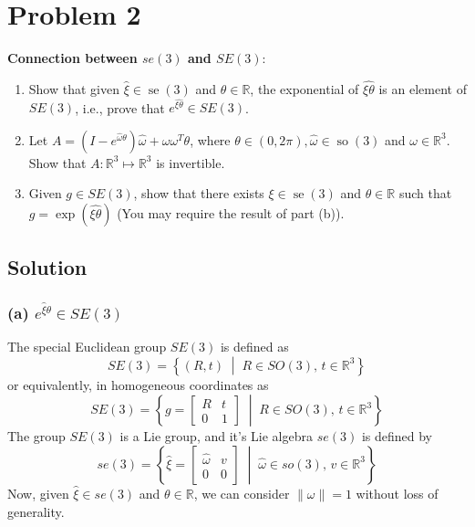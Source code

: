 \section*{Problem 2}
\setcounter{section}{2}
\setcounter{equation}{0}

\textbf{Connection between \( s e(3) \) and \( S E(3) \)}:
\begin{enumerate}[label= (\alph*)]
      \item Show that given \( \hat{\xi} \in \operatorname{se}(3) \) and \( \theta \in \mathbb{R} \), the exponential of \( \hat{\xi \theta} \) is an element of \( S E(3) \), i.e., prove that \( e^{\widehat{\xi \theta}} \in S E(3) \).
      \item Let \( A=\left(I-e^{\hat{\omega} \theta}\right) \hat{\omega}+\omega \omega^{T} \theta \), where \( \theta \in(0,2 \pi), \hat{\omega} \in \operatorname{so}(3) \) and \( \omega \in \mathbb{R}^{3} \).
            Show that \( A: \mathbb{R}^{3} \mapsto \mathbb{R}^{3} \) is invertible.
      \item Given \( g \in S E(3) \), show that there exists \( \xi \in \operatorname{se}(3) \) and \( \theta \in \mathbb{R} \) such that \( g=\exp (\widehat{\xi \theta}) \)
            (You may require the result of part (b)).
\end{enumerate}

\subsection*{Solution}

\subsubsection*{(a) \( e^{\hat{\xi}\theta} \in SE(3) \)}

The special Euclidean group \( SE(3) \) is defined as
\begin{equation*}
      SE(3) = \left \{ (R, t) \; \middle| \; R \in SO(3), \, t \in \mathbb{R}^3 \right \}
\end{equation*}
or equivalently, in homogeneous coordinates as
\begin{equation}\label{eq:SE3-homogeneous}
      SE(3) = \left \{ g = \begin{bmatrix}
            R & t \\
            0 & 1
      \end{bmatrix} \; \middle| \; R \in SO(3), \, t \in \mathbb{R}^3 \right \}
\end{equation}
The group \( SE(3) \) is a Lie group, and it's Lie algebra \( se(3) \) is defined by
\begin{equation*}
      se(3) = \left \{ \hat \xi = \begin{bmatrix}
            \hat \omega & v \\
            0           & 0
      \end{bmatrix} \; \middle| \; \hat \omega \in so(3), \, v \in \mathbb{R}^3 \right \}
\end{equation*}
Now, given \( \hat{\xi} \in se(3) \) and \( \theta \in \mathbb{R} \), we can consider \( \lVert \omega \rVert = 1 \) without loss of generality.

